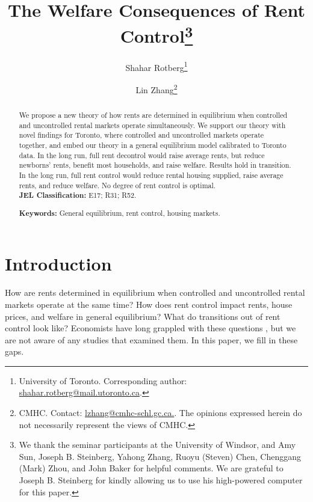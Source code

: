 \documentclass[parskip=full]{article}
\author{Shahar Rotberg\footnote{University of Toronto. Corresponding author: \url{shahar.rotberg@mail.utoronto.ca}.} \and Lin Zhang\footnote{CMHC. Contact: \url{lzhang@cmhc-schl.gc.ca.}. The opinions expressed herein do not necessarily represent the views of CMHC.}}
\title{\vspace{-1.8cm}The Welfare Consequences of Rent Control\footnote{We thank the seminar participants at the University of Windsor, and Amy Sun, Joseph B. Steinberg, Yahong Zhang, Ruoyu (Steven) Chen, Chenggang (Mark) Zhou, and John Baker for helpful comments. We are grateful to Joseph B. Steinberg for kindly allowing us to use his high-powered computer for this paper.}}
\begin{document}
\maketitle

\begin{abstract}
\onehalfspacing
\noindent We propose a new theory of how rents are determined in equilibrium when controlled and uncontrolled rental markets operate simultaneously. We support our theory with novel findings for Toronto, where controlled and uncontrolled markets operate together, and embed our theory in a general equilibrium model calibrated to Toronto data. In the long run, full rent decontrol would raise average rents, but reduce newborns' rents, benefit most households, and raise welfare. Results hold in transition. In the long run, full rent control would reduce rental housing supplied, raise average rents, and reduce welfare. No degree of rent control is optimal.
\\[1.5ex]

\noindent \textbf{JEL Classification:} E17; R31; R52. 

\noindent \textbf{Keywords:} General equilibrium, rent control, housing markets.
\end{abstract}

\section{Introduction}

How are rents determined in equilibrium when controlled and uncontrolled rental markets operate at the same time? How does rent control impact rents, house prices, and welfare in general equilibrium? What do transitions out of rent control look like? Economists have long grappled with these questions \citep{fraser-1981,arnott-1995}, but we are not aware of any studies that examined them. In this paper, we fill in these gaps.
\end{document}
